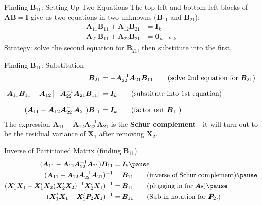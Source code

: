 \documentclass[aspectratio=169, handout, t]{beamer}
\numberwithin{equation}{section}
\begin{document}
\begin{frame}{Finding $\bm{B}_{11}$: Setting Up Two Equations}
The top-left and bottom-left blocks of $\bm{AB}=\bm{I}$ give us two equations in two unknowns ($\bm{B}_{11}$ and $\bm{B}_{21}$):
\begin{align*}
\bm{A}_{11}\bm{B}_{11}+\bm{A}_{12}\bm{B}_{21} &= \bm{I}_{k} \tag{from top-left block}\\
\bm{A}_{21}\bm{B}_{11}+\bm{A}_{22}\bm{B}_{21}&=\bm{0}_{n-k,k} \tag{from bottom-left block}
\end{align*}
Strategy: solve the second equation for $\bm{B}_{21}$, then substitute into the first.
\end{frame}

\begin{frame}{Finding $\bm{B}_{11}$: Substitution}
\begin{align*}
\bm{B}_{21}&=-\bm{A}_{22}^{-1}\bm{A}_{21}\bm{B}_{11} \tag{solve 2nd equation for $\bm{B}_{21}$}\\[6pt]
\bm{A}_{11}\bm{B}_{11}+\bm{A}_{12}\bigl[-\bm{A}_{22}^{-1}\bm{A}_{21}\bm{B}_{11}\bigr] &= \bm{I}_{k} \tag{substitute into 1st equation}\\[6pt]
(\bm{A}_{11}-\bm{A}_{12}\bm{A}_{22}^{-1}\bm{A}_{21})\bm{B}_{11}&= \bm{I}_{k} \tag{factor out $\bm{B}_{11}$}
\end{align*}
The expression $\bm{A}_{11}-\bm{A}_{12}\bm{A}_{22}^{-1}\bm{A}_{21}$ is the \textbf{Schur complement}---it will turn out to be the residual variance of $\bm{X}_1$ after removing $\bm{X}_2$.
\end{frame}


\begin{frame}{Inverse of Partitioned Matrix (finding $\bm{B}_{11}$)}
\begin{align*}
(\bm{A}_{11}-\bm{A}_{12}\bm{A}_{22}^{-1}\bm{A}_{21}) \bm{B}_{11} &= \bm{I}_{k}  \pause \\ 
(\bm{A}_{11}-\bm{A}_{12}\bm{A}_{22}^{-1}\bm{A}_{21})^{-1} &= \bm{B}_{11} \tag{inverse of Schur complement} \pause  \\ 
(\bm{X}_1'\bm{X}_1-\bm{X}_1'\bm{X}_2(\bm{X}_2'\bm{X}_2)^{-1}\bm{X}_2'\bm{X}_1)^{-1}&= \bm{B}_{11} \tag{plugging in for $\bm{A}$s}\pause  \\
(\bm{X}_1'\bm{X}_1-\bm{X}_1'\bm{P}_2\bm{X}_1)^{-1}&= \bm{B}_{11}  \tag{Sub in notation for $\bm{P}_2$.}
\end{align*}
\end{frame}
\end{document}
